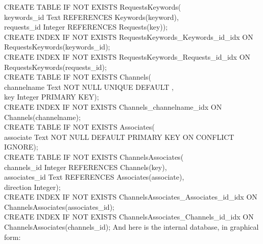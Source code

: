 CREATE TABLE IF NOT EXISTS RequestsKeywords(\\
\hspace*{\utilLen}keywords\_id Text REFERENCES Keywords(keyword),\\
\hspace*{\utilLen}requests\_id Integer REFERENCES Requests(key));\\
CREATE INDEX IF NOT EXISTS RequestsKeywords\_Keywords\_id\_idx ON\\
\hspace*{\utilLen}RequestsKeywords(keywords\_id);\\
CREATE INDEX IF NOT EXISTS RequestsKeywords\_Requests\_id\_idx ON\\
\hspace*{\utilLen}RequestsKeywords(requests\_id);\\
CREATE TABLE IF NOT EXISTS Channels(\\
\hspace*{\utilLen}channelname Text NOT NULL UNIQUE DEFAULT \fatUnderscore,\\
\hspace*{\utilLen}key Integer PRIMARY KEY);\\
CREATE INDEX IF NOT EXISTS Channels\_channelname\_idx ON Channels(channelname);\\
CREATE TABLE IF NOT EXISTS Associates(\\
\hspace*{\utilLen}associate Text NOT NULL DEFAULT \fatUnderscore{} PRIMARY KEY ON CONFLICT IGNORE);\\
CREATE TABLE IF NOT EXISTS ChannelsAssociates(\\
\hspace*{\utilLen}channels\_id Integer REFERENCES Channels(key),\\
\hspace*{\utilLen}associates\_id Text REFERENCES Associates(associate),\\
\hspace*{\utilLen}direction Integer);\\
CREATE INDEX IF NOT EXISTS ChannelsAssociates\_Associates\_id\_idx ON\\
\hspace*{\utilLen}ChannelsAssociates(associates\_id);\\
CREATE INDEX IF NOT EXISTS ChannelsAssociates\_Channels\_id\_idx ON\\
\hspace*{\utilLen}ChannelsAssociates(channels\_id);
\outputEnd{}
\newpage
And here is the internal database, in graphical form:\\
\appendixEnd{}
